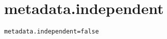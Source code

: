 \section{metadata.independent}
\label{configuration:MetadataIndependent}
\ClearAPI
\TODO
{}
\begin{lstlisting}[style=Props,caption={Usage example for \textit{metadata.independent}}]
metadata.independent=false
\end{lstlisting}